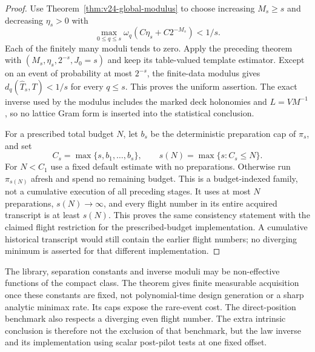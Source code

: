 \begin{proof}
Use Theorem~\ref{thm:v24-global-modulus} to choose increasing \(M_s\ge s\)
and decreasing \(\eta_s>0\) with
\[
            \max_{0\le q\le s}\omega_q(C\eta_s+C2^{-M_s})<1/s.
\]
Each of the finitely many moduli tends to zero.  Apply the preceding theorem
with \((M_s,\eta_s,2^{-s},J_0=s)\) and keep its table-valued template
estimator.  Except on an event of probability at most \(2^{-s}\), the
finite-data modulus gives \(d_q(\widehat T_s,T)<1/s\) for every \(q\le s\).
This proves the uniform assertion.  The exact inverse used by the modulus
includes the marked deck holonomies and \(L=VM^{-1}\), so no lattice Gram
form is inserted into the statistical conclusion.

For a prescribed total budget \(N\), let \(b_s\) be the deterministic
preparation cap of \(\pi_s\), and set
\[
 C_s=\max\{s,b_1,\ldots,b_s\},\qquad
 s(N)=\max\{s:C_s\le N\}.
\]
For \(N<C_1\) use a fixed default estimate with no preparations.  Otherwise
run \(\pi_{s(N)}\) afresh and spend no remaining budget.  This is a
budget-indexed family, not a cumulative execution of all preceding stages.
It uses at most \(N\) preparations, \(s(N)\to\infty\), and every flight
number in its entire acquired transcript is at least \(s(N)\).  This proves
the same consistency statement with the claimed flight restriction for the
prescribed-budget implementation.  A cumulative historical transcript would
still contain the earlier flight numbers; no diverging minimum is asserted
for that different implementation.
\end{proof}

The library, separation constants and inverse moduli may be non-effective
functions of the compact class.  The theorem gives finite measurable
acquisition once these constants are fixed, not polynomial-time design
generation or a sharp analytic minimax rate.  Its caps expose the rare-event
cost.  The direct-position benchmark also respects a diverging even flight
number.  The extra intrinsic conclusion is therefore not the exclusion of
that benchmark, but the law inverse and its implementation using scalar
post-pilot tests at one fixed offset.
